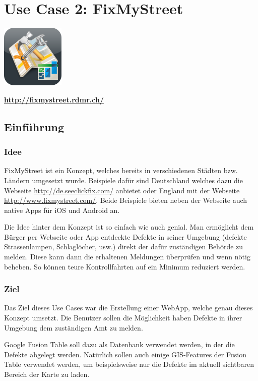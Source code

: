 \chapter{Use Case 2: FixMyStreet}
\label{fixmystreet}

\begin{center}
\includegraphics[scale=0.8]{images/usecase2-fixmystreet/fixmystreet-icon_with_gloss}

{\large \textbf{\url{http://fixmystreet.rdmr.ch/}}}
\end{center}

\section{Einführung}
\subsection{Idee}
FixMyStreet ist ein Konzept, welches bereits in verschiedenen Städten bzw. Ländern umgesetzt wurde. Beispiele dafür sind Deutschland welches dazu die Webseite  \url{http://de.seeclickfix.com/} anbietet oder England mit der Webseite \url{http://www.fixmystreet.com/}. Beide Beispiele bieten neben der Webseite auch native Apps für iOS und Android an.

Die Idee hinter dem Konzept ist so einfach wie auch genial. Man ermöglicht dem Bürger per Webseite oder App entdeckte Defekte in seiner Umgebung (defekte Strassenlampen, Schlaglöcher, usw.) direkt der dafür zuständigen Behörde zu melden. Diese kann dann die erhaltenen Meldungen überprüfen und wenn nötig beheben. So können teure Kontrollfahrten auf ein Minimum reduziert werden.

\subsection{Ziel}
Das Ziel dieses Use Cases war die Erstellung einer WebApp, welche genau dieses Konzept umsetzt. Die Benutzer sollen die Möglichkeit haben Defekte in ihrer Umgebung dem zuständigen Amt zu melden.

Google Fusion Table soll dazu als Datenbank verwendet werden, in der die Defekte abgelegt werden. Natürlich sollen auch einige GIS-Features der Fusion Table verwendet werden, um beispielsweise nur die Defekte im aktuell sichtbaren Bereich der Karte zu laden.

